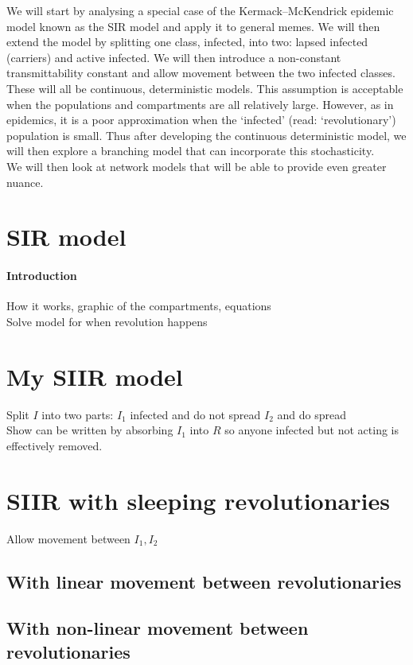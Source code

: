 We will start by analysing a special case of the Kermack–McKendrick epidemic model known as the SIR model and apply it to general memes. We will then extend the model by splitting one class, infected, into two: lapsed infected (carriers) and active infected. We will then introduce a non-constant transmittability constant and allow movement between the two infected classes.\\

These will all be continuous, deterministic models. This assumption is acceptable when the populations and compartments are all relatively large. However, as in epidemics, it is a poor approximation when the `infected' (read: `revolutionary') population is small\cite{models-epidemiology}. Thus after developing the continuous deterministic model, we will then explore a branching model that can incorporate this stochasticity.\\


We will then look at network models that will be able to provide even greater nuance.

\section{SIR model}
\paragraph{Introduction}


How it works, graphic of the compartments, equations\\
Solve model for when revolution happens
\section{My SIIR model}
Split $I$ into two parts: $I_1$ infected and do not spread $I_2$ and do spread\\
Show can be written by absorbing $I_1$ into $R$ so anyone infected but not acting is effectively removed.
\section{SIIR with sleeping revolutionaries}
Allow movement between $I_1,I_2$
\subsection{With linear movement between revolutionaries}

\subsection{With non-linear movement between revolutionaries}

